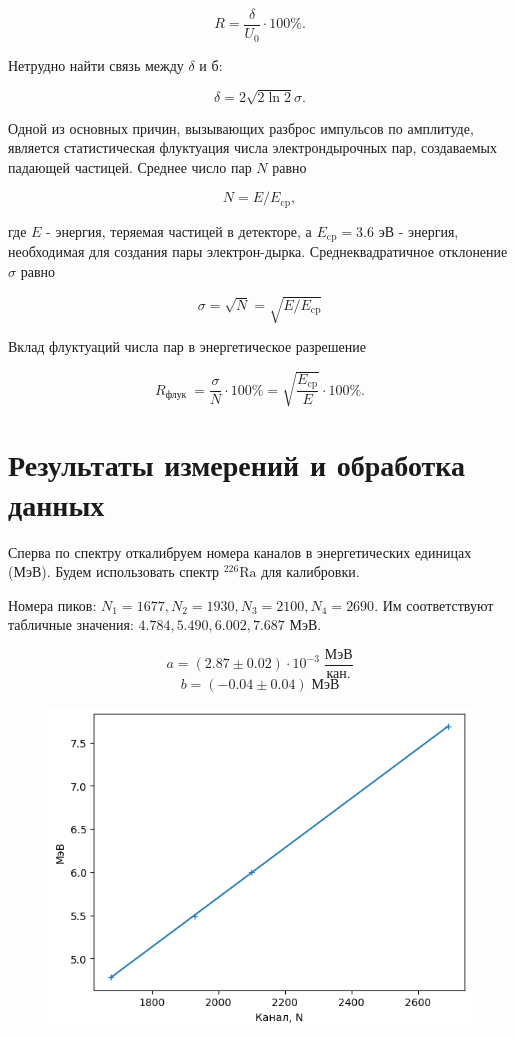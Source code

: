 \documentclass[a4paper, 12pt]{article}
\begin{document}
    $$
    R=\frac{\delta}{U_0} \cdot 100 \% .
    $$

    Нетрудно найти связь между $\delta$ и б:

    $$
    \delta=2 \sqrt{2 \ln 2} \sigma .
    $$

    Одной из основных причин, вызывающих разброс импульсов по амплитуде, является статистическая флуктуация числа электрондырочных пар, создаваемых падающей частицей. Среднее число пар $N$ равно

    $$
    N=E / E_{\mathrm{cp}},
    $$

    где $E$ - энергия, теряемая частицей в детекторе, а $E_{\mathrm{cp}}=3.6$ эВ - энергия, необходимая для создания пары электрон-дырка. Среднеквадратичное отклонение $\sigma$ равно

    $$
    \sigma=\sqrt{N}=\sqrt{E / E_{\mathrm{cp}}}
    $$

    Вклад флуктуаций числа пар в энергетическое разрешение

    $$
    R_{\text {флук }}=\frac{\sigma}{N} \cdot 100 \%=\sqrt{\frac{E_{\mathrm{cp}}}{E}} \cdot 100 \% .
    $$
    
    
\section{Результаты измерений и обработка данных} 

    Сперва по спектру откалибруем номера каналов в энергетических единицах (МэВ). Будем использовать спектр ${ }^{226} \mathrm{Ra}$ для калибровки.

    Номера пиков: $N_1 = 1677, N_2 = 1930, N_3 = 2100, N_4 = 2690$. Им соответствуют табличные значения: $4.784, 5.490, 6.002, 7.687$ МэВ.

    $$ a = (2.87 \pm 0.02) \cdot 10^{-3} \; \frac{ \text{МэВ} }{ \text{кан.} }$$
    $$ b = (-0.04 \pm 0.04) \; \text{МэВ}$$

    \begin{figure}[H]
        \centering
        \includegraphics[width=0.7\linewidth]{res/3.png}
    \end{figure}
\end{document}
